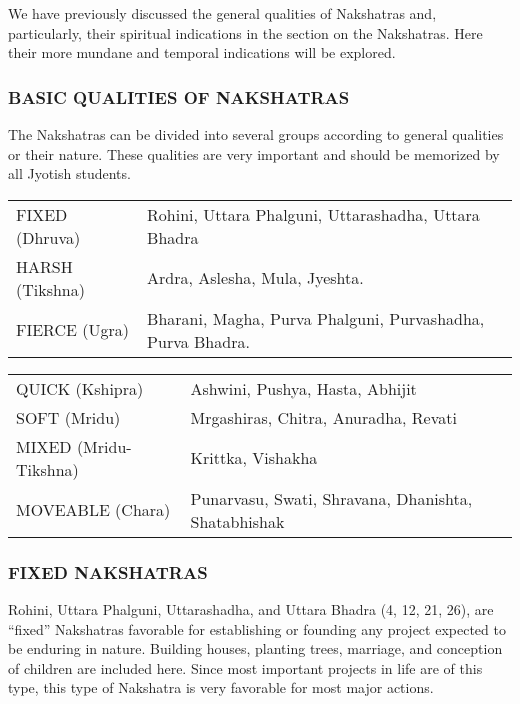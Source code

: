 We have previously discussed the general qualities of Nakshatras and, particularly, their spiritual indications in the section on the Nakshatras. Here their more mundane and temporal indications will be explored.

 

 

\subsubsection{BASIC QUALITIES OF NAKSHATRAS}
 

The Nakshatras can be divided into several groups according to general qualities or their nature. These qualities are very important and should be memorized by all Jyotish students.

 
\begin{center}
\begin{tabular}{ l l}
FIXED (Dhruva)	& Rohini, Uttara Phalguni, Uttarashadha, Uttara Bhadra \\
HARSH (Tikshna)	 &Ardra, Aslesha, Mula, Jyeshta.                                   \\
FIERCE (Ugra)	 &Bharani, Magha, Purva Phalguni, Purvashadha, Purva Bhadra.  \\
 \end{tabular}
\end{center}

\begin{center}
\begin{tabular}{ l l}
QUICK (Kshipra)	 &Ashwini, Pushya, Hasta, Abhijit                                   \\
SOFT (Mridu)	 &Mrgashiras, Chitra, Anuradha, Revati                                   \\
MIXED (Mridu-Tikshna)	 &Krittka, Vishakha                                   \\
MOVEABLE (Chara)	 &Punarvasu, Swati, Shravana, Dhanishta, Shatabhishak                                   \\
  \end{tabular}
\end{center}

 

\subsubsection{FIXED NAKSHATRAS}

Rohini, Uttara Phalguni, Uttarashadha, and Uttara Bhadra (4, 12, 21, 26), are “fixed” Nakshatras favorable for establishing or founding any project expected to be enduring in nature. Building houses, planting trees, marriage, and conception of children are included here. Since most important projects in life are of this type, this type of Nakshatra is very favorable for most major actions.

